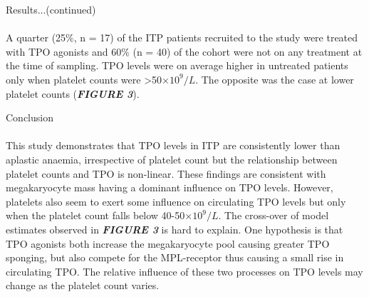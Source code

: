 \documentclass[landscape,a0paper,fontscale=0.285]{beamer} %
\newlength{\onecolwid}
\begin{document}
\begin{frame}[t]
\begin{columns}[t]
\begin{column}{\onecolwid}
\begin{block}{Results...(continued)}
\paragraph{} A quarter (25\%, n = 17) of the ITP patients recruited to the study were treated with TPO agonists and 60\% (n = 40) of the cohort were not on any treatment at the time of sampling. TPO levels were on average higher in untreated patients only when  platelet counts were >50$\times 10^9/L$. The opposite was the case at lower platelet counts (\textbf{\emph{FIGURE 3}}).  

\end{block}


\begin{block}{Conclusion}

\paragraph{} This study demonstrates that TPO levels in ITP are consistently lower than aplastic anaemia, irrespective of platelet count but the relationship between platelet counts and TPO is non-linear. These findings are consistent with megakaryocyte mass having a dominant influence on TPO levels. However, platelets also seem to exert some influence on circulating TPO levels but only when the platelet count falls below 40-50$\times10^9/L$. The cross-over of model estimates observed in \textbf{\emph{FIGURE 3}} is hard to explain. One hypothesis is that TPO agonists both increase the megakaryocyte pool causing greater TPO sponging, but also compete for the MPL-receptor thus causing a small rise in circulating TPO. The relative influence of these two processes on TPO levels may change as the platelet count varies.  

\end{block}





\end{column}
\end{columns}
\end{frame}
\end{document}
